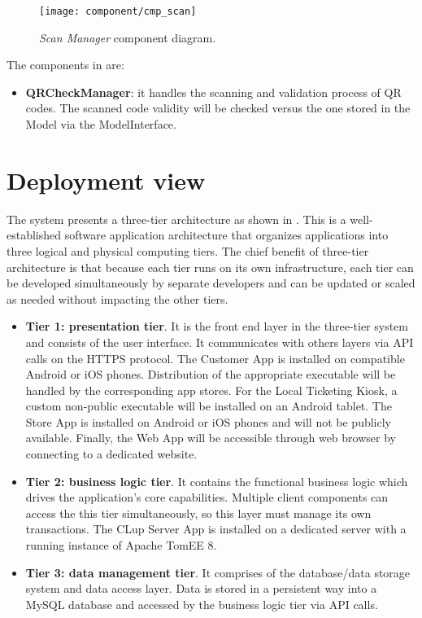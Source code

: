 \begin{figure}[H]
	\centering
	\texttt{[image: component/cmp\_scan]}
	\caption{\textit{Scan Manager} component diagram.}
	\label{fig:cmp_scan}
\end{figure}

The components in  are:
\begin{itemize}
	\item \textbf{QRCheckManager}: it handles the scanning and validation process of QR codes. The scanned code validity will be checked versus the one stored in the Model via the ModelInterface.
\end{itemize}
\clearpage

\section{Deployment view}\label{sec:deployment_view}
The system presents a three-tier architecture as shown in . This is a well-established software application architecture that organizes applications into three logical and physical computing tiers. The chief benefit of three-tier architecture is that because each tier runs on its own infrastructure, each tier can be developed simultaneously by separate developers and can be updated or scaled as needed without impacting the other tiers.

\begin{itemize}
	\item \textbf{Tier 1: presentation tier}. It is the front end layer in the three-tier system and consists of the user interface. It communicates with others layers via API calls on the HTTPS protocol.\newline
	The Customer App is installed on compatible Android or iOS phones. Distribution of the appropriate executable will be handled by the corresponding app stores. For the Local Ticketing Kiosk, a custom non-public executable will be installed on an Android tablet.\newline
	The Store App is installed on Android or iOS phones and will not be publicly available.\newline
	Finally, the Web App will be accessible through web browser by connecting to a dedicated website.
	
	\item \textbf{Tier 2: business logic tier}. It contains the functional business logic which drives the application’s core capabilities. Multiple client components can access the this tier simultaneously, so this layer must manage its own transactions.\newline
	The CLup Server App is installed on a dedicated server with a running instance of Apache TomEE 8.
	
	\item \textbf{Tier 3: data management tier}. It comprises of the database/data storage system and data access layer. Data is stored in a persistent way into a MySQL database and accessed by the business logic tier via API calls.
\end{itemize}


